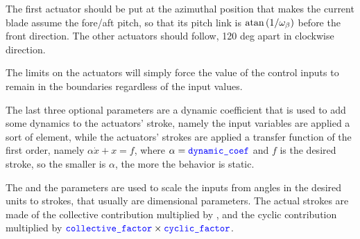 The first actuator should be put at the azimuthal position 
that makes the current blade assume the fore/aft pitch,
so that its pitch link is $\mathrm{atan}\left( 1/\omega_{\beta} \right)$
before the front direction.
The other actuators should follow, 120 deg apart in clockwise direction.

The limits on the actuators will simply force the value of the control
inputs to remain in the boundaries regardless of the input values.

The last three optional parameters are a dynamic coefficient that is used to
add some dynamics to the actuators' stroke, namely the input variables are
applied a sort of   element, while the
actuators' strokes are applied a transfer function of the first order, namely
$ \alpha\dot{x}+x=f $, where $ \alpha=\textcolor{blue}{\texttt{dynamic\_coef}} $ and $ f $ is
the desired stroke, so the smaller is $ \alpha $, the more the behavior is
static.

The  and the  parameters are
used to scale the inputs from angles in the desired units to strokes, that
usually are dimensional parameters. The actual strokes are made of the
collective contribution multiplied by , and the
cyclic contribution multiplied by
$\textcolor{blue}{\texttt{collective\_factor}} \times \textcolor{blue}{\texttt{cyclic\_factor}}$.

